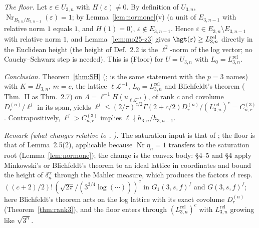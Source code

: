 \emph{The floor.} Let $\varepsilon\in U_{3,n}$ with $H(\varepsilon)\ne0$. By definition of $U_{3,n}$, $\operatorname{Nr}_{B_{3,n}/B_{3,n-1}}(\varepsilon)=1$; by Lemma~\ref{lem:normone}(v) (a unit of $E_{3,n-1}$ with relative norm $1$ equals $1$, and $H(1)=0$), $\varepsilon\notin E_{3,n-1}$. Hence $\varepsilon\in E_{3,n}\setminus E_{3,n-1}$ with relative norm $1$, and Lemma~\ref{lem:mo25-z3} gives $\hgt(\varepsilon)\ge L^{\mathrm{rel}}_{3,n}$ directly in the Euclidean height (the height of \cite{MO16} Def.~2.2 is the $\ell^2$-norm of the log vector; no Cauchy--Schwarz step is needed). This is (Floor) for $U=U_{3,n}$ with $L_0=L^{\mathrm{rel}}_{3,n}$.

\emph{Conclusion.} Theorem~\ref{thm:SH} (;  is the same statement with the $p=3$ names) with $K=B_{3,n}$, $m=c$, the lattice $\ell\mathcal L^{-1}$, $L_0=L^{\mathrm{rel}}_{3,n}$ and Blichfeldt's theorem (\cite{Bl14} Thm.~II as \cite{MO16} Thm.~2.7) on $\Lambda=\ell^{-1}H(u_{\ell\mathcal L^{-1}})$, of rank $c$ and covolume $D_r^{(n)}/\ell^{f}$ in its span, yields $\ell^{f}\le(2/\pi)^{c/2}\Gamma(2+c/2)D_r^{(n)}/(L^{\mathrm{rel}}_{3,n})^{c}=C^{(3)}_{n,r}$. Contrapositively, $\ell^f>C^{(3)}_{n,r}$ implies $\ell\nmid h_{3,n}/h_{3,n-1}$.

\emph{Remark (what changes relative to \cite{MO13}, \cite{MO16}).} The saturation input is that of \cite{MO13}; the floor is that of \cite{MO16} Lemma~2.5(2), applicable because $\operatorname{Nr}\eta_n=1$ transfers to the saturation root (Lemma~\ref{lem:normone}); the change is the convex body: \cite{MO13} \S4--5 and \cite{MO16} \S4 apply Minkowski's or Blichfeldt's theorem to an ideal lattice in coordinates and bound the height of $\delta_n^{\alpha}$ through the Mahler measure, which produces the factors $c!$ resp.\ $((c+2)/2)!\,(\sqrt{2\pi}/(3^{3/4}\log(\cdots)))^{c}$ in $G_1(3,s,f)^f$ and $G(3,s,f)^f$; here Blichfeldt's theorem acts on the log lattice with its exact covolume $D_r^{(n)}$ (Theorem~\ref{thm:rank3}), and the floor enters through $(L^{\mathrm{rel}}_{3,n})^{c}$ with $L^{\mathrm{rel}}_{3,n}$ growing like $\sqrt{3^n}$.
